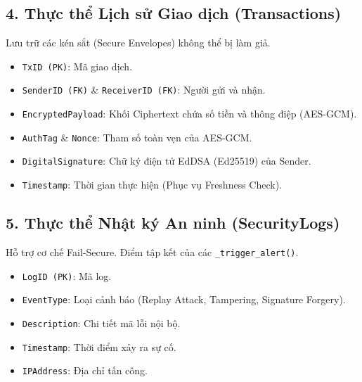 \documentclass[11pt,a4paper]{article}
\begin{document}
\subsection{4. Thực thể Lịch sử Giao dịch (Transactions)}
Lưu trữ các kén sắt (Secure Envelopes) không thể bị làm giả.
\begin{itemize}[noitemsep]
    \item \texttt{TxID (PK)}: Mã giao dịch.
    \item \texttt{SenderID (FK)} \& \texttt{ReceiverID (FK)}: Người gửi và nhận.
    \item \texttt{EncryptedPayload}: Khối Ciphertext chứa số tiền và thông điệp (AES-GCM).
    \item \texttt{AuthTag} \& \texttt{Nonce}: Tham số toàn vẹn của AES-GCM.
    \item \texttt{DigitalSignature}: Chữ ký điện tử EdDSA (Ed25519) của Sender.
    \item \texttt{Timestamp}: Thời gian thực hiện (Phục vụ Freshness Check).
\end{itemize}

\subsection{5. Thực thể Nhật ký An ninh (SecurityLogs)}
Hỗ trợ cơ chế Fail-Secure. Điểm tập kết của các \texttt{\_trigger\_alert()}.
\begin{itemize}[noitemsep]
    \item \texttt{LogID (PK)}: Mã log.
    \item \texttt{EventType}: Loại cảnh báo (Replay Attack, Tampering, Signature Forgery).
    \item \texttt{Description}: Chi tiết mã lỗi nội bộ.
    \item \texttt{Timestamp}: Thời điểm xảy ra sự cố.
    \item \texttt{IPAddress}: Địa chỉ tấn công.
\end{itemize}
\end{document}

